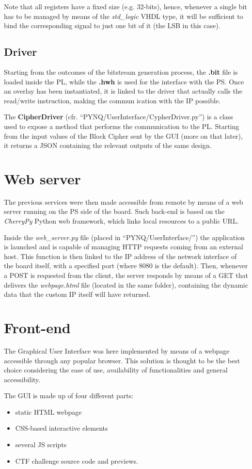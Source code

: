 Note that all registers have a fixed size (e.g. 32-bits), hence, whenever a single bit has to be managed by means of the \emph{std\_logic} VHDL type, it will be sufficient to bind the corresponding signal to just one bit of it (the LSB in this case).
\subsection{Driver}
Starting from the outcomes of the bitstream generation process, the \textbf{.bit} file is loaded inside the PL, while the \textbf{.hwh} is used for the interface with the PS.
Once an overlay has been instantiated, it is linked to the driver that actually calls the read/write instruction, making the commun ication with the IP possible.

The \textbf{CipherDriver} (cfr. ``PYNQ/UserInterface/CypherDriver.py'') is a class used to expose a method that performs the communication to the PL.
Starting from the input values of the Block Cipher sent by the GUI (more on that later), it returns a JSON containing the relevant outputs of the same design.
\section{Web server}
The previous services were then made accessible from remote by means of a web server running on the PS side of the board.
Such back-end is based on the \emph{CherryPy} Python web framework, which links local resources to a public URL.

Inside the \emph{web\_server.py} file (placed in ``PYNQ/UserInterface/'') the application is launched and is capable of managing HTTP requests coming from an external host.
This function is then linked to the IP address of the network interface of the board itself, with a specified port (where 8080 is the default).
Then, whenever a POST is requested from the client, the server responds by means of a GET that delivers the \emph{webpage.html} file (located in the same folder), containing the dynamic data that the custom IP itself will have returned.
\section{Front-end}
The Graphical User Interface was here implemented by means of a webpage accessible through any popular browser. This solution is thought to be the best choice considering the ease of use, availability of functionalities and general accessibility.

The GUI is made up of four different parts:
\begin{itemize}
\item static HTML webpage
\item CSS-based interactive elements
\item several JS scripts
\item CTF challenge source code and previews.
\end{itemize}
